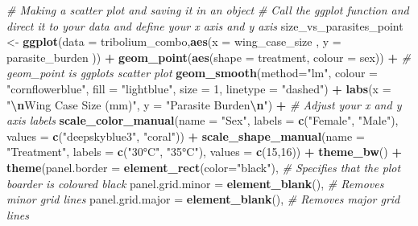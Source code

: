 \documentclass[
]{book}
\newenvironment{Shaded}{\begin{snugshade}}{\end{snugshade}}
\newcommand{\AttributeTok}[1]{\textcolor[rgb]{0.13,0.29,0.53}{#1}}
\newcommand{\CommentTok}[1]{\textcolor[rgb]{0.56,0.35,0.01}{\textit{#1}}}
\newcommand{\DecValTok}[1]{\textcolor[rgb]{0.00,0.00,0.81}{#1}}
\newcommand{\FunctionTok}[1]{\textcolor[rgb]{0.13,0.29,0.53}{\textbf{#1}}}
\newcommand{\NormalTok}[1]{#1}
\newcommand{\OtherTok}[1]{\textcolor[rgb]{0.56,0.35,0.01}{#1}}
\newcommand{\SpecialCharTok}[1]{\textcolor[rgb]{0.81,0.36,0.00}{\textbf{#1}}}
\newcommand{\StringTok}[1]{\textcolor[rgb]{0.31,0.60,0.02}{#1}}
\begin{document}
\begin{Shaded}
\begin{Highlighting}[]
\CommentTok{\# Making a scatter plot and saving it in an object}
\CommentTok{\# Call the ggplot function and direct it to your data and define your x axis and y axis}
\NormalTok{size\_vs\_parasites\_point }\OtherTok{\textless{}{-}} \FunctionTok{ggplot}\NormalTok{(}\AttributeTok{data =}\NormalTok{ tribolium\_combo,}\FunctionTok{aes}\NormalTok{(}\AttributeTok{x =}\NormalTok{ wing\_case\_size , }\AttributeTok{y =}\NormalTok{ parasite\_burden )) }\SpecialCharTok{+} 
  \FunctionTok{geom\_point}\NormalTok{(}\FunctionTok{aes}\NormalTok{(}\AttributeTok{shape =}\NormalTok{ treatment, }\AttributeTok{colour =}\NormalTok{ sex)) }\SpecialCharTok{+} \CommentTok{\# geom\_point is ggplots scatter plot}
  \FunctionTok{geom\_smooth}\NormalTok{(}\AttributeTok{method=}\StringTok{"lm"}\NormalTok{, }\AttributeTok{colour =} \StringTok{"cornflowerblue"}\NormalTok{, }\AttributeTok{fill =} \StringTok{"lightblue"}\NormalTok{, }\AttributeTok{size =} \DecValTok{1}\NormalTok{, }\AttributeTok{linetype =} \StringTok{"dashed"}\NormalTok{) }\SpecialCharTok{+}
  \FunctionTok{labs}\NormalTok{(}\AttributeTok{x =} \StringTok{"}\SpecialCharTok{\textbackslash{}n}\StringTok{Wing Case Size (mm)"}\NormalTok{, }\AttributeTok{y =} \StringTok{"Parasite Burden}\SpecialCharTok{\textbackslash{}n}\StringTok{"}\NormalTok{) }\SpecialCharTok{+} \CommentTok{\# Adjust your x and y axis labels }
  \FunctionTok{scale\_color\_manual}\NormalTok{(}\AttributeTok{name =} \StringTok{"Sex"}\NormalTok{, }\AttributeTok{labels =} \FunctionTok{c}\NormalTok{(}\StringTok{"Female"}\NormalTok{, }\StringTok{"Male"}\NormalTok{), }\AttributeTok{values =} \FunctionTok{c}\NormalTok{(}\StringTok{"deepskyblue3"}\NormalTok{, }\StringTok{"coral"}\NormalTok{)) }\SpecialCharTok{+}
  \FunctionTok{scale\_shape\_manual}\NormalTok{(}\AttributeTok{name =} \StringTok{"Treatment"}\NormalTok{, }\AttributeTok{labels =} \FunctionTok{c}\NormalTok{(}\StringTok{"30°C"}\NormalTok{, }\StringTok{"35°C"}\NormalTok{), }\AttributeTok{values =} \FunctionTok{c}\NormalTok{(}\DecValTok{15}\NormalTok{,}\DecValTok{16}\NormalTok{)) }\SpecialCharTok{+}
  \FunctionTok{theme\_bw}\NormalTok{() }\SpecialCharTok{+}
  \FunctionTok{theme}\NormalTok{(}\AttributeTok{panel.border =} \FunctionTok{element\_rect}\NormalTok{(}\AttributeTok{color=}\StringTok{"black"}\NormalTok{), }\CommentTok{\# Specifies that the plot boarder is coloured black}
        \AttributeTok{panel.grid.minor =} \FunctionTok{element\_blank}\NormalTok{(), }\CommentTok{\# Removes minor grid lines }
        \AttributeTok{panel.grid.major =} \FunctionTok{element\_blank}\NormalTok{(), }\CommentTok{\# Removes major grid lines }

\end{Highlighting}
\end{Shaded}
\end{document}
